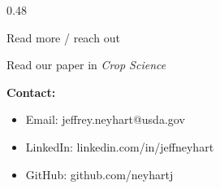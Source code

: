 \documentclass[final]{beamer}
\newlength{\onecolwid}
\newlength{\twocolwid}
\begin{document}
\begin{frame}[t]
\begin{columns}[t]
\begin{column}{\twocolwid}
\begin{columns}[t,totalwidth=\twocolwid]

\begin{column}{0.48\twocolwid}


\begin{alertblock}{Read more / reach out}

\begin{minipage}{0.3\linewidth}
\end{minipage} \hfill
\begin{minipage}{0.7\linewidth}
Read our paper in \textit{Crop Science}
\end{minipage}


\textbf{Contact:}
\begin{itemize}
  \item Email: jeffrey.neyhart@usda.gov
  \item LinkedIn: linkedin.com/in/jeffneyhart
  \item GitHub: github.com/neyhartj
\end{itemize}



%
%
%
%
%
%
%
%
%
%
%
%
%
%
%
%
%
%



\end{alertblock}
\end{column}
\end{columns}
\end{column}
\end{columns}
\end{frame}
\end{document}
